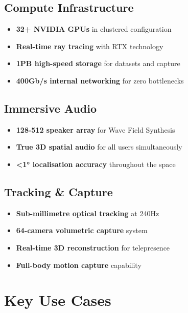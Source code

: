 \subsection*{Compute Infrastructure}
\begin{itemize}
    \item \textbf{32+ NVIDIA GPUs} in clustered configuration
    \item \textbf{Real-time ray tracing} with RTX technology
    \item \textbf{1PB high-speed storage} for datasets and capture
    \item \textbf{400Gb/s internal networking} for zero bottlenecks
\end{itemize}

\subsection*{Immersive Audio}
\begin{itemize}
    \item \textbf{128-512 speaker array} for Wave Field Synthesis
    \item \textbf{True 3D spatial audio} for all users simultaneously
    \item \textbf{<1° localisation accuracy} throughout the space
\end{itemize}

\subsection*{Tracking \& Capture}
\begin{itemize}
    \item \textbf{Sub-millimetre optical tracking} at 240Hz
    \item \textbf{64-camera volumetric capture} system
    \item \textbf{Real-time 3D reconstruction} for telepresence
    \item \textbf{Full-body motion capture} capability
\end{itemize}

\section*{Key Use Cases}

